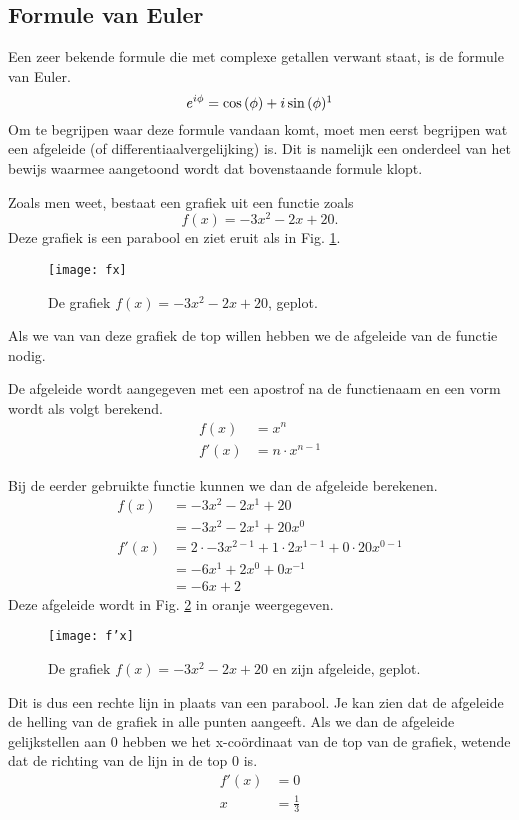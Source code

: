 \documentclass[11pt,fleqn]{book} %
\begin{document}
\subsection{Formule van Euler}
Een zeer bekende formule die met complexe getallen verwant staat, is de formule van Euler.
\begin{equation}\label{eq:euler}
e^{i\phi}=\cos{(\phi)}+i\sin{(\phi)}\footnotemark
\end{equation}
Om te begrijpen waar deze formule vandaan komt, moet men eerst begrijpen wat een afgeleide (of differentiaalvergelijking) is. Dit is namelijk een onderdeel van het bewijs waarmee aangetoond wordt dat bovenstaande formule klopt.

Zoals men weet, bestaat een grafiek uit een functie zoals
\begin{displaymath}
f(x)=-3x^2-2x+20.
\end{displaymath}
Deze grafiek is een parabool en ziet eruit als in Fig. \ref{fig:fx3}.
\begin{figure}[h]
	\centering\texttt{[image: fx]}
	\caption{De grafiek $f(x)=-3x^2-2x+20$, geplot.}
	\label{fig:fx3}
\end{figure}
Als we van van deze grafiek de top willen hebben we de afgeleide van de functie nodig.
\begin{definition}
De afgeleide wordt aangegeven met een apostrof na de functienaam en een vorm wordt als volgt berekend.
\begin{align*}
f(x) &=x^n\\
f'(x) &=n\cdot x^{n-1}
\end{align*}
\end{definition}
Bij de eerder gebruikte functie kunnen we dan de afgeleide berekenen.
\begin{align*}
f(x) &=-3x^2-2x^1+20\\
&=-3x^2-2x^1+20x^0\\
f'(x) &= 2\cdot -3x^{2-1}+1\cdot 2x^{1-1}+0\cdot 20x^{0-1}\\
&=-6x^1+2x^0 +0x^{-1}\\
&=-6x+2
\end{align*}
Deze afgeleide wordt in Fig. \ref{fig:f'x} in oranje weergegeven.
\begin{figure}[h]
	\centering\texttt{[image: f'x]}
	\caption{De grafiek $f(x)=-3x^2-2x+20$ en zijn afgeleide, geplot.}
	\label{fig:f'x}
\end{figure}

Dit is dus een rechte lijn in plaats van een parabool. Je kan zien dat de afgeleide de helling van de grafiek in alle punten aangeeft. Als we dan de afgeleide gelijkstellen aan 0 hebben we het x-coördinaat van de top van de grafiek, wetende dat de richting van de lijn in de top 0 is.
\begin{align*}
f'(x) &= 0\\
x &= \frac{1}{3}
\end{align*}
\end{document}
